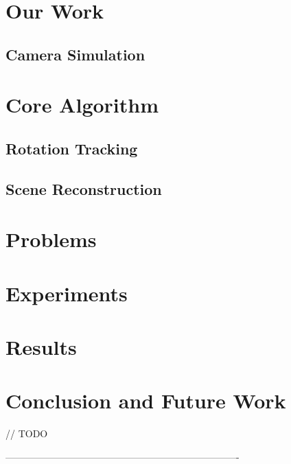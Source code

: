 \documentclass[10pt,twocolumn,letterpaper]{article}
\begin{document}
\section{Our Work}
\label{sec:our_work}


\subsection{Camera Simulation}
\label{sec:simulation}



\section{Core Algorithm}
\label{sec:core_algorithm}


\subsection{Rotation Tracking}
\label{sec:tracking}


\subsection{Scene Reconstruction}
\label{sec:scene_reconstruction}



\section{Problems}
\label{sec:problems}



\section{Experiments}
\label{sec:experiments}



\section{Results}
\label{sec:results}


\section{Conclusion and Future Work}
\label{sec:conclusion}
// TODO

-------------------------------------------------------------------------
{\small


}
\end{document}
